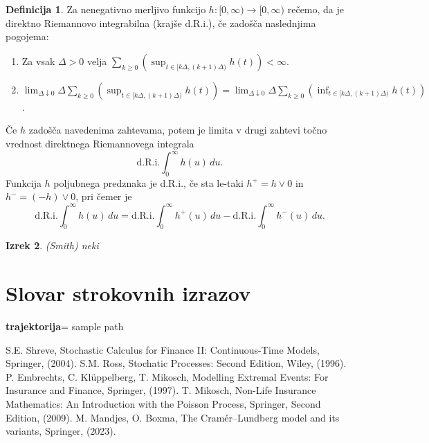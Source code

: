 \documentclass[12pt, a4paper, reqno]{amsart}
\theoremstyle{definition}
\newtheorem{definicija}{Definicija}[section]
\theoremstyle{plain}
\newtheorem{izrek}[definicija]{Izrek}
\newcommand{\geslo}[2]{\noindent\textbf{#1}\hspace*{3mm}\hangindent=\parindent\hangafter=1 #2}
\newcommand{\1}{\mathds{1}}
\begin{document}
    \begin{definicija}
        Za nenegativno merljivo funkcijo \( h : [0, \infty) \to [0, \infty) \) rečemo, da je direktno Riemannovo integrabilna (krajše d.R.i.), če zadošča naslednjima pogojema:
        \begin{enumerate}
            \item Za vsak \(\Delta > 0\) velja \( \sum_{k \geq 0} \left( \sup_{t \in [k\Delta, (k+1)\Delta)} h(t) \right) < \infty \).
            \item \(\lim_{\Delta \downarrow 0} \Delta \sum_{k \geq 0} \left( \sup_{t \in [k\Delta, (k+1)\Delta)} h(t) \right) = \lim_{\Delta \downarrow 0} \Delta \sum_{k \geq 0} \left( \inf_{t \in [k\Delta, (k+1)\Delta)} h(t) \right)\).
        \end{enumerate}
        Če \(h\) zadošča navedenima zahtevama, potem je limita v drugi zahtevi točno vrednost direktnega Riemannovega integrala
        \[
        \text{d.R.i.} \int_{0}^{\infty} h(u) \, du.
        \]
        Funkcija \(h\) poljubnega predznaka je d.R.i., če sta le-taki \(h^+ = h \vee 0\) in \(h^- = (-h) \vee 0\), pri čemer je
        \[
        \text{d.R.i.} \int_{0}^{\infty} h(u) \, du = \text{d.R.i.} \int_{0}^{\infty} h^+(u) \, du - \text{d.R.i.} \int_{0}^{\infty} h^-(u) \, du.
        \]
        \label{def:direktnaRieamnovaIntegrabilnost}
    \end{definicija}

    \begin{izrek}(Smith)
        neki
        \label{izr:Smith}
        
    \end{izrek}


\section*{Slovar strokovnih izrazov}

\geslo{trajektorija}{sample path}
%
%


\begin{thebibliography}{99}
S.E. Shreve, Stochastic Calculus for Finance II: Continuous-Time Models, Springer, (2004).
S.M. Ross, Stochatic Processes: Second Edition, Wiley, (1996).
P. Embrechts, C. Klüppelberg, T. Mikosch, Modelling Extremal Events: For Insurance and Finance, Springer, (1997).
T. Mikosch, Non-Life Insurance Mathematics: An Introduction with the Poisson Process, Springer, Second Edition, (2009).
M. Mandjes, O. Boxma, The Cramér--Lundberg model and its variants, Springer, (2023).
\end{thebibliography}
\end{document}
